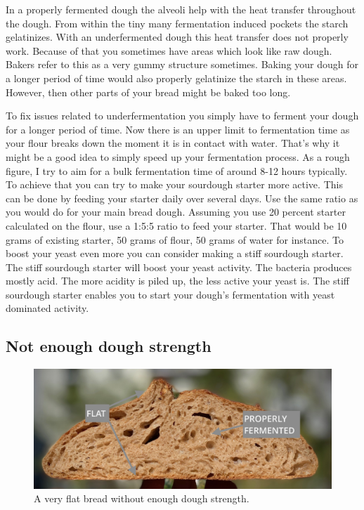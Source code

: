 In a properly fermented dough the alveoli help with the heat transfer throughout the dough.
From within the tiny many fermentation induced pockets the starch gelatinizes. With
an underfermented dough this heat transfer does not properly work. Because of that
you sometimes have areas which look like raw dough. Bakers refer to this as a very
gummy structure sometimes. Baking your dough for a longer period of time would also properly
gelatinize the starch in these areas. However, then other parts of your bread
might be baked too long.

To fix issues related to underfermentation you simply have to ferment your dough
for a longer period of time. Now there is an upper limit to fermentation time
as your flour breaks down the moment it is in contact with water. That's why it
might be a good idea to simply speed up your fermentation process. As a rough
figure, I try to aim for a bulk fermentation time of around 8-12 hours typically.
To achieve that you can try to make your sourdough starter more active.  This can be done
by feeding your starter daily over several days. Use the same ratio as you would
do for your main bread dough. Assuming you use 20 percent starter calculated on the flour,
use a 1:5:5 ratio to feed your starter. That would be 10 grams of existing starter,
50 grams of flour, 50 grams of water for instance. To boost your yeast even more you can
consider making a stiff sourdough starter. The stiff sourdough starter will
boost your yeast activity. The bacteria produces mostly acid. The more acidity
is piled up, the less active your yeast is. The stiff sourdough starter
enables you to start your dough's fermentation with yeast dominated activity.


\subsection{Not enough dough strength}

\begin{figure}
  \includegraphics[width=\textwidth]{flat-bread}
  \caption{A very flat bread without enough dough strength.}
  \label{flat-bread}
\end{figure}

